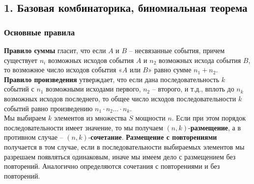 \subsection*{1. Базовая комбинаторика, биномиальная теорема}
\subsubsection*{Основные правила}
\textbf{Правило суммы} гласит, что если $A$ и $B$ 
-- несвязанные собы­тия, причем существует $n_i$ 
возможных исходов события $A$
и $n_2$ воз­можных исхода события $B$, то возможное число 
исходов события «$A$ или $B$» равно сумме $n_1 + n_2$. 
\\ \indent
\textbf{Правило произведения} утверждает, что если дана
последователь­ность $k$ событий с $n_1$ возможными исходами 
первого, $n_2$ -- второ­го, и т.д., вплоть до $n_k$ 
возможных исходов последнего, то общее число исходов
последовательности $k$ событий равно произведению
$n_1 \cdot n_2 \ldots \cdot n_k$.
\\ \indent
Мы выбираем $k$ элементов из множества $S$ мощности $n$. 
Если при этом порядок последовательности имеет значение, 
то мы получа­ем $(n, k)$-\textbf{размещение}, а в 
противном случае -- $(n, k)$-\textbf{сочетание}.
\textbf{Размещение с повторениями} получается в том случае, 
если в по­следовательности выбираемых элементов мы 
разрешаем появляться одинаковым, иначе мы имеем дело с 
размещением без повторе­ний. 
Аналогично определяются сочетания с повторениями и без
повторений.
